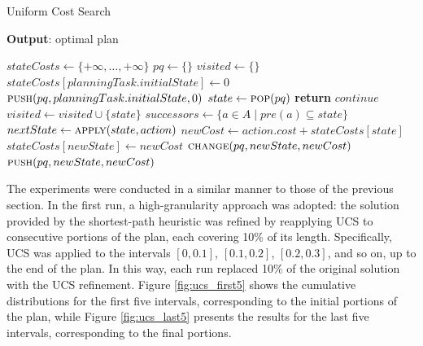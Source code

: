 \begin{algorithm}
	\caption{Uniform Cost Search}
	\label{alg:ucs}
	\hspace*{0.5em} \textbf{Output}: optimal plan
	\begin{algorithmic}[1]
		\State $stateCosts \gets \{+\infty, \dots, +\infty\}$ 
		\State $pq \gets \{\}$ 
		\State $visited \gets \{\}$ 
		\State $stateCosts[planningTask.initialState] \gets 0$
		\State $\Call{push}{pq, planningTask.initialState, 0}$ 
		\State $state \gets \Call{pop}{pq}$ 
		\State \textbf{return} 
		\EndIf
		\State $continue$ 
		\EndIf
		\State $visited \gets visited \cup \{state\}$
		\State $successors \gets \{a \in A \mid pre(a) \subseteq state\}$
		\State $nextState \gets \Call{apply}{state, action}$
		\State $newCost \gets action.cost + stateCosts[state]$
		\State $stateCosts[newState] \gets newCost$
		\State $\Call{change}{pq, newState, newCost}$
		\Else
		\State $\Call{push}{pq, newState, newCost}$
		\EndIf
		\EndIf
		\EndFor
		\EndWhile
		\EndProcedure
	\end{algorithmic}
\end{algorithm}

The experiments were conducted in a similar manner to those of the previous section. In the first run, a high-granularity approach was adopted:
the solution provided by the shortest-path heuristic was refined by reapplying \textsc{UCS} to consecutive portions of the plan, each covering 10\% of its length.
Specifically, \textsc{UCS} was applied to the intervals $[0,0.1]$, $[0.1,0.2]$, $[0.2,0.3]$, and so on, up to the end of the plan. In this way, each run replaced
10\% of the original solution with the \textsc{UCS} refinement. Figure \ref{fig:ucs_first5} shows the cumulative distributions for the first five intervals,
corresponding to the initial portions of the plan, while Figure \ref{fig:ucs_last5} presents the results for the last five intervals,
corresponding to the final portions.

